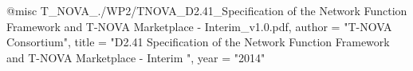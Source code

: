 @misc{ T_NOVA_./WP2/TNOVA_D2.41_Specification of the Network Function Framework and T-NOVA Marketplace - Interim_v1.0.pdf,
       author = "{T-NOVA Consortium}",
       title = "D2.41 Specification of the Network Function Framework and T-NOVA Marketplace - Interim ",
       year = "2014" }
